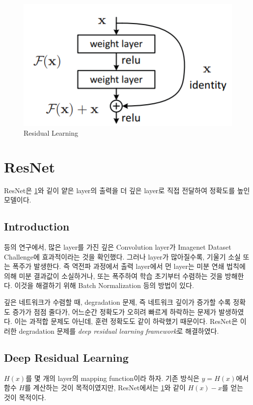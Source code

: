 \documentclass[extendedabs]{bmvc2k}
\begin{document}
\begin{figure}[t]
	\includegraphics[width=\linewidth]{images/residual.PNG}
	\caption{Residual Learning}
 \label{fig:ResidualLearning}
	\vspace{-2mm}
\end{figure}

\section{ResNet}
ResNet\cite{resnet}은 \ref{fig:ResidualLearning}와 깉이 얕은 layer의 출력을 더 깊은 layer로 직접 전달하여 정확도를 높인 모델이다.

\subsection{Introduction}
\cite{simonyan2015deepconvolutionalnetworkslargescale} 등의 연구에서, 많은 layer를 가진 깊은 Convolution layer가 Imagenet Dataset Challenge에 효과적이라는 것을 확인했다. 그러나 layer가 많아질수록, 기울기 소실 또는 폭주가 발생한다. 즉 역전파 과정에서 출력 layer에서 먼 layer는 미분 연쇄 법칙에 의해 미분 결과값이 소실하거나, 또는 폭주하여 학습 초기부터 수렴하는 것을 방해한다. 이것을 해결하기 위해 Batch Normalization 등의 방법이 있다.

깊은 네트워크가 수렴할 때, degradation 문제, 즉 네트워크 깊이가 증가할 수록 정확도 증가가 점점 줄다가, 어느순간 정확도가 오히려 빠르게 하락하는 문제가 발생하였다. 이는 과적합 문제도 아닌데, 훈련 정확도도 같이 하락했기 때문이다. ResNet\cite{resnet}은 이러한 degradation 문제를 \emph{deep residual learning framework}로 해결하였다. 
\subsection{Deep Residual Learning}
$H(x)$를 몇 개의 layer의 mapping function이라 하자. 기존 방식은 $y=H(x)$에서 함수 $H$를 계산하는 것이 목적이였지만, ResNet에서는 \ref{fig:ResidualLearning}와 같이 $H(x)-x$를 얻는 것이 목적이다. 
\end{document}
